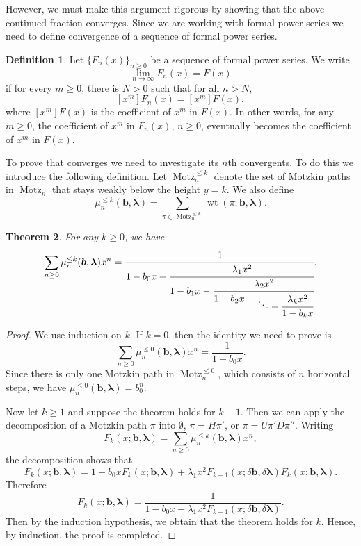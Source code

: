 \documentclass[oneside]{book}
\numberwithin{equation}{section}
\newtheorem{thm}{Theorem}[section]
\theoremstyle{definition}
\newtheorem{defn}[thm]{Definition}
\newcommand\Motz{\operatorname{Motz}}
\newcommand\wt{\operatorname{wt}}
\renewcommand\vec[1]{\bm{#1}}
\newcommand\vb{\vec{b}}
\newcommand\vla{\vec{\lambda}}
\begin{document}
However, we must make this argument rigorous by showing that the above
continued fraction converges. Since we are working with formal power
series we need to define convergence of a sequence of formal power
series.

\begin{defn}
  Let \( \{ F_n(x)\}_{n\ge 0} \) be a sequence of formal power
  series. We write
  \[
    \lim_{n\to \infty} F_n(x) = F(x)
  \]
  if for every \( m\ge0 \), there is \( N>0 \)
  such that for all \( n>N \),
  \[
    [x^m] F_n(x) = [x^m] F(x),
  \]
  where \( [x^m] F(x) \) is the coefficient of \( x^m \) in
  \( F(x) \). In other words, for any \( m\ge0 \), the coefficient of
  \( x^m \) in \( F_n(x) \), \( n\ge0 \), eventually becomes the
  coefficient of \( x^m \) in \( F(x) \).
\end{defn}

To prove that  converges we need to investigate its
\( n \)th convergents. To do this we introduce the following
definition. Let \( \Motz^{\le k}_n \) denote the set of Motzkin paths
in \( \Motz_n \) that stays weakly below the height \( y=k \). We also
define
\[
  \mu^{\le k}_n(\vb, \vla) = \sum_{\pi\in \Motz^{\le k}_n}  \wt(\pi; \vb,\vla).
\]

\begin{thm}\label{thm:14}
  For any \( k\ge0 \), we have
\[
  \sum_{n\ge0} \mu_n^{\le k}(\vb,\vla)x^n = 
  \cfrac{1}{
    1-b_0x- \cfrac{\lambda_1x^2}{
      1-b_1x- \cfrac{\lambda_2x^2}{
        1-b_2x- \genfrac{}{}{0pt}{1}{}{\displaystyle\ddots -
          \cfrac{\lambda_kx^2}{1-b_kx}}} }}.
\]
\end{thm}

\begin{proof}
  We use induction on \( k \).
  If \( k=0 \), then the identity we need to prove is
  \[
    \sum_{n\ge0} \mu_n^{\le 0}(\vb,\vla)x^n = \frac{1}{1-b_0x}.
  \]
  Since there is only one Motzkin path in \( \Motz^{\le 0}_n \), which
  consists of \( n \) horizontal steps, we have
  \( \mu_n^{\le 0}(\vb,\vla) = b_0^n \).

  Now let \( k\ge 1 \) and suppose the theorem holds for \( k-1 \). Then
  we can apply the decomposition of a Motzkin path \( \pi \) into
  \( \emptyset \), \( \pi=H\pi' \), or \( \pi = U\pi'D\pi'' \).
  Writing
  \[
    F_k(x;\vb,\vla) = \sum_{n\ge0} \mu_n^{\le k}(\vb,\vla)x^n,
  \]
  the decomposition shows that
  \[
    F_k(x;\vb,\vla) = 1 + b_0x F_k(x;\vb,\vla) + \lambda_1 x^2
    F_{k-1}(x;\delta\vb,\delta\vla) F_k(x;\vb,\vla).
  \]
  Therefore
  \[
    F_k(x;\vb,\vla) = \frac{1}{1 - b_0x - \lambda_1 x^2
      F_{k-1}(x;\delta\vb, \delta\vla)}.
  \]
  Then by the induction hypothesis, we obtain that the theorem holds
  for \( k \). Hence, by induction, the proof is completed.
\end{proof}
\end{document}
